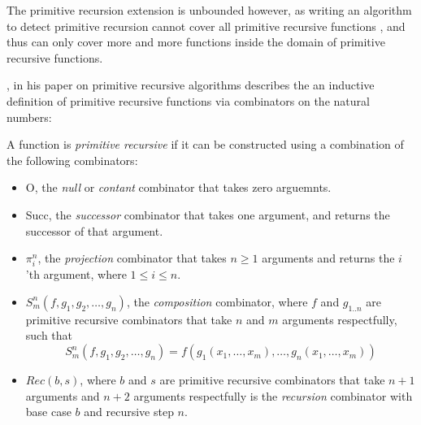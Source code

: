 The primitive recursion extension is unbounded however, as writing an algorithm to detect primitive
recursion cannot cover all primitive recursive functions , and thus can only cover more and more
functions inside the domain of primitive recursive functions.

\citet{AboutPrimrecAlgorithms}, in his paper on primitive recursive algorithms describes the
an inductive definition of primitive recursive functions via
combinators on the natural numbers:

\theoremstyle{definition}
\begin{definition}
    \label{def:primrec}
    A function is \textit{primitive recursive} if it can be constructed using 
    a combination of the following combinators:

    \begin{itemize}
        \item 
            \textsf{O}, the \textit{null} or \textit{contant} combinator that takes zero arguemnts.
        \item 
            \textsf{Succ}, the \textit{successor} combinator that takes one argument, and returns the successor
            of that argument.
        \item 
            \textsf{$\pi^n_i$}, the \textit{projection} combinator that takes $n \geq 1$ arguments and returns
            the $i$'th argument, where $1 \leq i \leq n$.
        \item 
            \textsf{$S^n_m(f, g_1, g_2, \dots, g_n)$}, the \textit{composition} combinator, where $f$ and $g_{1..n}$ are 
            primitive recursive combinators that take $n$ and $m$ arguments respectfully, such that 
                $$S^n_m(f, g_1, g_2, \dots, g_n) = f(g_1(x_1, \dots, x_m), \dots, g_n(x_1, \dots, x_m))$$
        \item 
            \textsf{$Rec(b,s)$}, where $b$ and $s$ are primitive recursive combinators that take
            $n + 1$ arguments and $n + 2$ arguments respectfully is the \textit{recursion}
            combinator with base case $b$ and recursive step $n$.
    \end{itemize}
\end{definition}